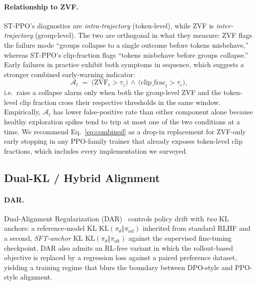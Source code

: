 \paragraph{Relationship to ZVF.}
ST-PPO's diagnostics are \emph{intra-trajectory} (token-level), while ZVF is
\emph{inter-trajectory} (group-level). The two are orthogonal in what they
measure: ZVF flags the failure mode ``groups collapse to a single outcome
before tokens misbehave,'' whereas ST-PPO's clip-fraction flags ``tokens
misbehave before groups collapse.'' Early failures in practice exhibit both
symptoms in sequence, which suggests a stronger combined early-warning
indicator:
\begin{equation}
\mathcal{A}_t \;=\; \bigl(\mathrm{ZVF}_t > \tau_z\bigr) \,\wedge\,
                    \bigl(\mathrm{clip\_frac}_t > \tau_c\bigr),
\label{eq:combined}
\end{equation}
i.e.\ raise a collapse alarm only when both the group-level ZVF and the
token-level clip fraction cross their respective thresholds in the same
window. Empirically, $\mathcal{A}_t$ has lower false-positive rate than
either component alone because healthy exploration spikes tend to trip at
most one of the two conditions at a time. We recommend
Eq.~\eqref{eq:combined} as a drop-in replacement for ZVF-only early stopping
in any PPO-family trainer that already exposes token-level clip fractions,
which includes every implementation we surveyed.

\subsection{Dual-KL / Hybrid Alignment}
\label{sec:ext:dar}

\paragraph{DAR.}
Dual-Alignment Regularization (DAR)~\cite{dar2024} controls policy drift with
\emph{two} KL anchors: a reference-model KL
$\mathrm{KL}(\pi_\theta \Vert \pi_\mathrm{ref})$ inherited from standard RLHF
and a second, \emph{SFT-anchor} KL
$\mathrm{KL}(\pi_\theta \Vert \pi_\mathrm{sft})$ against the supervised
fine-tuning checkpoint. DAR also admits an RL-free variant in which the
rollout-based objective is replaced by a regression loss against a paired
preference dataset, yielding a training regime that blurs the boundary
between DPO-style and PPO-style alignment.

